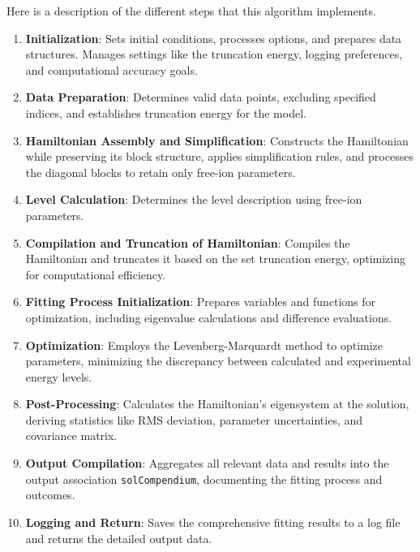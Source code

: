 \documentclass{article}
\newcommand{\codetext}[1]{{\color{BlueViolet} \texttt{#1}}}
\begin{document}
Here is a description of the different steps that this algorithm implements.
\begin{enumerate}
  \item \textbf{Initialization}: Sets initial conditions, processes options, and prepares data structures. Manages settings like the truncation energy, logging preferences, and computational accuracy goals.
  
  \item \textbf{Data Preparation}: Determines valid data points, excluding specified indices, and establishes truncation energy for the model.
  
  \item \textbf{Hamiltonian Assembly and Simplification}: Constructs the Hamiltonian while preserving its block structure, applies simplification rules, and processes the diagonal blocks to retain only free-ion parameters.
  
  \item \textbf{Level Calculation}: Determines the level description using free-ion parameters.
  
  \item \textbf{Compilation and Truncation of Hamiltonian}: Compiles the Hamiltonian and truncates it based on the set truncation energy, optimizing for computational efficiency.
  
  \item \textbf{Fitting Process Initialization}: Prepares variables and functions for optimization, including eigenvalue calculations and difference evaluations.
  
  \item \textbf{Optimization}: Employs the Levenberg-Marquardt method to optimize parameters, minimizing the discrepancy between calculated and experimental energy levels.
  
  \item \textbf{Post-Processing}: Calculates the Hamiltonian's eigensystem at the solution, deriving statistics like RMS deviation, parameter uncertainties, and covariance matrix.
  
  \item \textbf{Output Compilation}: Aggregates all relevant data and results into the output association \codetext{solCompendium}, documenting the fitting process and outcomes.
  
  \item \textbf{Logging and Return}: Saves the comprehensive fitting results to a log file and returns the detailed output data.
\end{enumerate}
\end{document}
